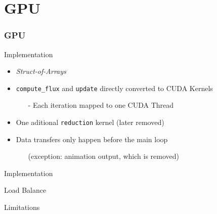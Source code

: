 \section{GPU}


%
%
\begin{frame}
	\frametitle{GPU}

	\begin{block}{Implementation}
		\begin{itemize}\itemsep=20pt
			\item \textit{Struct-of-Arrays}
			\pause

			\item \texttt{compute\_flux} and \texttt{update} directly converted to CUDA Kernels
			\begin{itemize}
				\item[-] Each iteration mapped to one CUDA Thread
			\end{itemize}
			\pause

			\item One aditional \texttt{reduction} kernel (later removed)
			\pause

			\item Data transfers only happen before the main loop
			\pause
			\begin{itemize}
				\item[] (exception: animation output, which is removed)
			\end{itemize}
		\end{itemize}
	\end{block}
\end{frame}

\begin{frame}
	\begin{block}{Implementation}
	\end{block}
	\begin{block}{Load Balance}
	\end{block}
	\begin{block}{Limitations}
	\end{block}
\end{frame}
